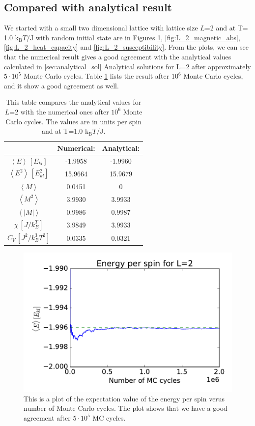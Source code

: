 \subsection{Compared with analytical result}

We started with a small two dimensional lattice with lattice size $L$=2 and at T= 1.0 $\text{k}_\text{B}T/\text{J}$ with random initial state are in Figures \ref{fig:L_2_energy}, \ref{fig:L_2_magnetic_abs}, \ref{fig:L_2_heat_capacity} and \ref{fig:L_2_susceptibility}. From the plots, we can see that the numerical result gives a good agreement with the analytical values calculated in \ref{sec:analytical_sol} Analytical solutions for L=2 after approximately $5\cdot 10^5$ Monte Carlo cycles. Table \ref{tab:compare_values} lists the result after $10^6$ Monte Carlo cycles, and it show a good agreement as well. 

\begin{table}\caption{This table compares the analytical values for $L$=2 with the numerical ones after $10^6$ Monte Carlo cycles. The values are in units per spin and at T=1.0 $\text{k}_\text{B}T/\text{J}$.}\label{tab:compare_values}
\begin{tabular}{ccc}
& Numerical: & Analytical:\\ \hline
$\left<E\right>\, [E_{kl}]$ &   -1.9958 & -1.9960\\
$\left<E^2\right>\, [E_{kl}^2]$ &   15.9664 & 15.9679\\
$\left<M\right>$ &    0.0451 & 0\\
$\left<M^2\right>$ &    3.9930 & 3.9933\\
$\left<|M|\right>$ &    0.9986 & 0.9987\\
$\chi \, [J/k_B^T]$ &   3.9849 & 3.9933\\
$C_V \, [J^2/k_B^3T^2]$& 0.0335 & 0.0321\\
\end{tabular}
\end{table}

\begin{figure}[H]
\includegraphics[width=\linewidth]{../results/4b/L_2_energy}\caption{This is a plot of the expectation value of the energy per spin verus number of Monte Carlo cycles. The plot shows that we have a good agreement after $ 5 \cdot 10^{5} $ MC cycles.}\label{fig:L_2_energy}
\end{figure}

